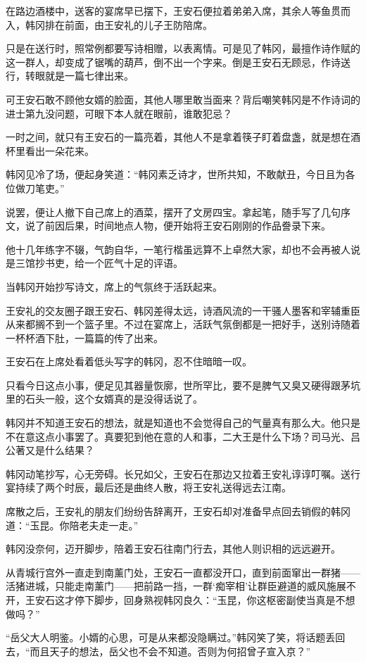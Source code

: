 在路边酒楼中，送客的宴席早已摆下，王安石便拉着弟弟入席，其余人等鱼贯而入，韩冈排在前面，由王安礼的儿子王防陪席。 

只是在送行时，照常例都要写诗相赠，以表离情。可是见了韩冈，最擅作诗作赋的这一群人，却变成了锯嘴的葫芦，倒不出一个字来。倒是王安石无顾忌，作诗送行，转眼就是一篇七律出来。 

可王安石敢不顾他女婿的脸面，其他人哪里敢当面来？背后嘲笑韩冈是不作诗词的进士第九没问题，可眼下本人就在眼前，谁敢犯忌？ 

一时之间，就只有王安石的一篇亮着，其他人不是拿着筷子盯着盘盏，就是想在酒杯里看出一朵花来。 

韩冈见冷了场，便起身笑道：“韩冈素乏诗才，世所共知，不敢献丑，今日且为各位做刀笔吏。” 

说罢，便让人撤下自己席上的酒菜，摆开了文房四宝。拿起笔，随手写了几句序文，说了前因后果，时间地点人物，便开始将王安石刚刚的作品誊录下来。 

他十几年练字不辍，气韵自华，一笔行楷虽远算不上卓然大家，却也不会再被人说是三馆抄书吏，给一个匠气十足的评语。 

当韩冈开始抄写诗文，席上的气氛终于活跃起来。 

王安礼的交友圈子跟王安石、韩冈差得太远，诗酒风流的一干骚人墨客和宰辅重臣从来都搁不到一个篮子里。不过在宴席上，活跃气氛倒都是一把好手，送别诗随着一杯杯酒下肚，一篇篇的传了出来。 

王安石在上席处看着低头写字的韩冈，忍不住暗暗一叹。 

只看今日这点小事，便足见其器量恢廓，世所罕比，要不是脾气又臭又硬得跟茅坑里的石头一般，这个女婿真的是没得话说了。 

韩冈并不知道王安石的想法，就是知道也不会觉得自己的气量真有那么大。他只是不在意这点小事罢了。真要犯到他在意的人和事，二大王是什么下场？司马光、吕公著又是什么结果？ 

韩冈动笔抄写，心无旁碍。长兄如父，王安石在那边又拉着王安礼谆谆叮嘱。送行宴持续了两个时辰，最后还是曲终人散，将王安礼送得远去江南。 

席散之后，王安礼的朋友们纷纷告辞离开，王安石却对准备早点回去销假的韩冈道：“玉昆。你陪老夫走一走。” 

韩冈没奈何，迈开脚步，陪着王安石往南门行去，其他人则识相的远远避开。 

从青城行宫外一直走到南薰门处，王安石一直都没开口，直到前面窜出一群猪——活猪进城，只能走南薰门——把前路一挡，一群‘痴宰相’让群臣避道的威风施展不开，王安石这才停下脚步，回身熟视韩冈良久：“玉昆，你这枢密副使当真是不想做吗？” 

“岳父大人明鉴。小婿的心思，可是从来都没隐瞒过。”韩冈笑了笑，将话题丢回去，“而且天子的想法，岳父也不会不知道。否则为何招曾子宣入京？” 

